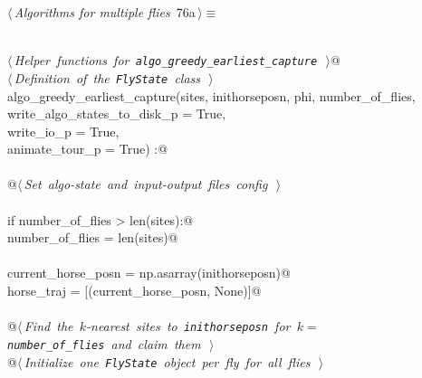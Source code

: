\documentclass[11.5pt]{report}
\begin{document}
\begin{flushleft} \small
\begin{minipage}{\linewidth}\label{scrap113}\raggedright\small
{} $\langle\,${\itshape Algorithms for multiple flies}\nobreak\ {\footnotesize {76a}}$\,\rangle\equiv$
\vspace{-1ex}
\begin{list}{}{} \item
\mbox{}\verb@@\\
\mbox{}\verb@@\hbox{$\langle\,${\itshape Helper functions for \verb|algo_greedy_earliest_capture|}\nobreak\ {\footnotesize {}}$\,\rangle$}\verb@    @\\
\mbox{}\verb@@\hbox{$\langle\,${\itshape Definition of the \verb|FlyState| class}\nobreak\ {\footnotesize {}}$\,\rangle$}\verb@@\\
\mbox{}\verb@def algo_greedy_earliest_capture(sites, inithorseposn, phi, number_of_flies,\@\\
\mbox{}\verb@                                 write_algo_states_to_disk_p = True,\@\\
\mbox{}\verb@                                 write_io_p                  = True,\@\\
\mbox{}\verb@                                 animate_tour_p              = True) :@\\
\mbox{}\verb@@\\
\mbox{}\verb@    @\hbox{$\langle\,${\itshape Set algo-state and input-output files config}\nobreak\ {\footnotesize {}}$\,\rangle$}\verb@@\\
\mbox{}\verb@@\\
\mbox{}\verb@    if number_of_flies > len(sites):@\\
\mbox{}\verb@          number_of_flies = len(sites)@\\
\mbox{}\verb@@\\
\mbox{}\verb@    current_horse_posn = np.asarray(inithorseposn)@\\
\mbox{}\verb@    horse_traj         = [(current_horse_posn, None)]@\\
\mbox{}\verb@@\\
\mbox{}\verb@    @\hbox{$\langle\,${\itshape Find the $k$-nearest sites to \verb|inithorseposn| for $k=$\verb|number_of_flies| and claim them}\nobreak\ {\footnotesize {}}$\,\rangle$}\verb@@\\
\mbox{}\verb@    @\hbox{$\langle\,${\itshape Initialize one \verb|FlyState| object per fly for all flies}\nobreak\ {\footnotesize {}}$\,\rangle$}\verb@@\\

\end{list}
\end{minipage}
\end{flushleft}
\end{document}
